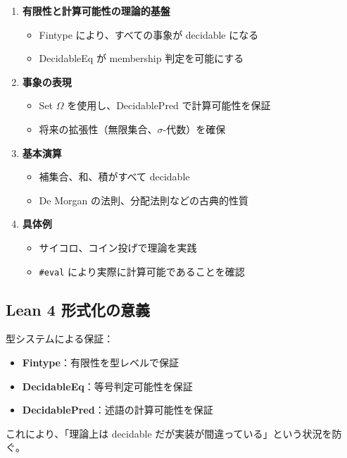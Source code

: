 \documentclass[12pt,a4paper,ja=standard]{bxjsarticle}
\theoremstyle{definition}
\begin{document}
\begin{enumerate}
    \item \textbf{有限性と計算可能性の理論的基盤}
    \begin{itemize}
        \item Fintype により、すべての事象が decidable になる
        \item DecidableEq が membership 判定を可能にする
    \end{itemize}
    
    \item \textbf{事象の表現}
    \begin{itemize}
        \item Set $\Omega$ を使用し、DecidablePred で計算可能性を保証
        \item 将来の拡張性（無限集合、$\sigma$-代数）を確保
    \end{itemize}
    
    \item \textbf{基本演算}
    \begin{itemize}
        \item 補集合、和、積がすべて decidable
        \item De Morgan の法則、分配法則などの古典的性質
    \end{itemize}
    
    \item \textbf{具体例}
    \begin{itemize}
        \item サイコロ、コイン投げで理論を実践
        \item \texttt{\#eval} により実際に計算可能であることを確認
    \end{itemize}
\end{enumerate}

\subsection{Lean 4 形式化の意義}

\begin{keypoint}
型システムによる保証：
\begin{itemize}
    \item \textbf{Fintype}：有限性を型レベルで保証
    \item \textbf{DecidableEq}：等号判定可能性を保証
    \item \textbf{DecidablePred}：述語の計算可能性を保証
\end{itemize}

これにより、「理論上は decidable だが実装が間違っている」という状況を防ぐ。
\end{keypoint}
\end{document}
